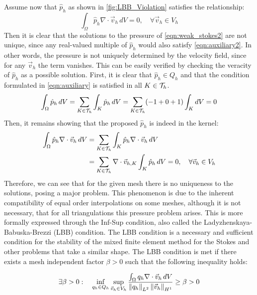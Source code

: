 Assume now that $\hat{p}_h$ as shown in \autoref{fig:LBB_Violation} satisfies the relationship:
\begin{equation}
	\int_{\Omega} \hat{p}_h\nabla\cdot\vec{v}_h\,dV = 0, \quad \forall \vec{v}_h \in V_h
	\label{eqn:auxiliary2}
\end{equation}
Then it is clear that the solutions to the pressure of \autoref{eqn:weak_stokes2} are not unique, since any real-valued multiple of $\hat{p}_h$ would also satisfy \autoref{eqn:auxiliary2}. In other words, the pressure is not uniquely determined by the velocity field, since for any $\vec{v}_h$ the term vanishes. This can be easily verified by checking the veracity of $\hat{p}_h$ as a possible solution. First, it is clear that $\hat{p}_h\in Q_h$ and that the condition formulated in \autoref{eqn:auxiliary} is satisfied in all $K\in\mathcal{T}_h$.
\begin{equation*}
	\int_{\Omega} \hat{p}_h \,dV = \sum_{K\in\mathcal{T}_h} \int_{K} \hat{p}_{h}\,dV = \sum_{K\in\mathcal{T}_h}(-1+0+1)\int_{K}dV  = 0
\end{equation*}
Then, it remains showing that the proposed $\hat{p}_h$ is indeed in the kernel:
\begin{align*}
	\int_{\Omega} \hat{p}_h\nabla\cdot\vec{v}_h\,dV & = \sum_{K\in\mathcal{T}_h}	\int_{K} \hat{p}_{h}\nabla\cdot\vec{v}_{h}\,dV                                           \\
	                                                & = \sum_{K\in\mathcal{T}_h}\nabla\cdot\vec{v}_{h,K} \int_{K} \hat{p}_{h}\,dV = 0, \quad \forall \vec{v}_{h} \in V_h
\end{align*}
Therefore, we can see that for the given mesh there is no uniqueness to the solutions, posing a major problem. This phenomenon is due to the inherent compatibility of equal order interpolations on some meshes, although it is not necessary, that for all triangulations this pressure problem arises. This is more formally expressed through the Inf-Sup condition, also called the Ladyzhenskaya-Babuska-Brezzi (LBB) condition. The LBB condition is a necessary and sufficient condition for the stability of the mixed finite element method for the Stokes and other problems that take a similar shape. The LBB condition is met if there exists a mesh independent factor $\beta > 0$ such that the following inequality holds:

\begin{equation}
	\exists \beta > 0:\quad \inf_{q_h\in Q_h} \sup_{\vec{v}_h\in V_h} \frac{\int_{\Omega} q_h\nabla\cdot\vec{v}_h\,dV}{\left\lVert q_h\right\rVert_{L^2}\left\lVert\vec{v}_h\right\rVert_{H^1}} \geq \beta > 0
	\label{eqn:LBB}
\end{equation}

